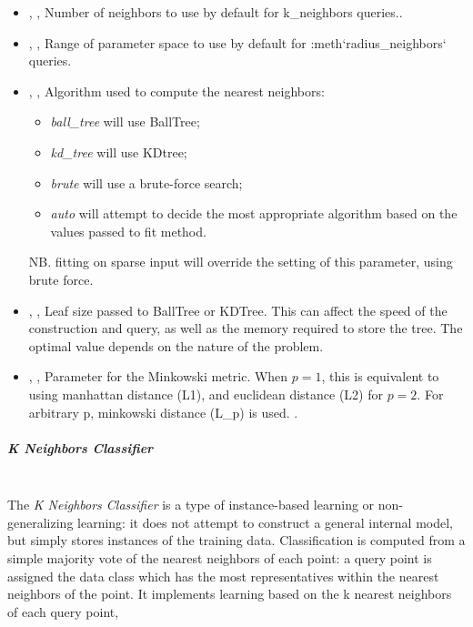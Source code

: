 \begin{itemize}
  \item {}, ,
  Number of neighbors to use by default for k\_neighbors queries..
  \item {}, ,
  Range of parameter space to use by default for :meth`radius\_neighbors`
  queries.
  \item {}, ,
  Algorithm used to compute the nearest neighbors:
\begin{itemize}
    \item \textit{ball\_tree} will use BallTree;
    \item \textit{kd\_tree} will use KDtree;
    \item \textit{brute} will use a brute-force search;
    \item \textit{auto} will attempt to decide the most appropriate algorithm
    based on the values passed to fit method.
\end{itemize}
  NB.
  fitting on sparse input will override the setting of this parameter, using
  brute force.
  \item {}, ,
  Leaf size passed to BallTree or KDTree.
  This can affect the speed of the construction and query, as well as the memory
  required to store the tree.
  The optimal value depends on the nature of the problem.
  \item {}, ,
  Parameter for the Minkowski metric.
  When $p = 1$, this is equivalent to using manhattan distance (L1), and
  euclidean distance (L2) for $p = 2$.
  For arbitrary p, minkowski distance (L\_p) is used.
  .
\end{itemize}
\subparagraph{K Neighbors Classifier }
\mbox{}
\\The \textit{K Neighbors Classifier} is a type of instance-based learning or
non-generalizing learning: it does not attempt to construct a general internal
model, but simply stores instances of the training data.
%
Classification is computed from a simple majority vote of the nearest neighbors
of each point: a query point is assigned the data class which has the most
representatives within the nearest neighbors of the point.
%
It implements learning based on the k nearest neighbors of each query point,
